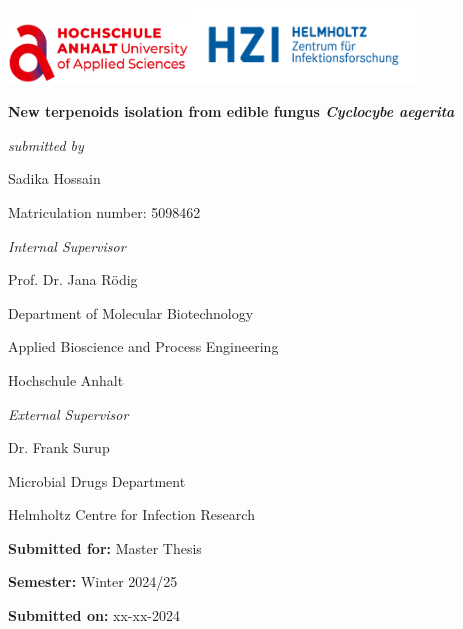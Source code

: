 \begin{titlepage}
	\centering
	
	\vspace{1.5cm}


{%
    \includegraphics[height=1.6cm, keepaspectratio]{images/logo/hs-anhalt-logo.png}\hfill\includegraphics[height=2cm, keepaspectratio]{images/logo/hzi-logo.png}
}

  \vspace{1cm}
	
	{\Large\bfseries New terpenoids isolation from edible fungus \textit{Cyclocybe aegerita}}
 
 
	

 
	\vspace{1cm}

	
	
	{\itshape submitted by}\par


	{\Large Sadika Hossain\par}
	{\small Matriculation number: 5098462\par}

        
        \vspace{1.5cm}
        
	{\itshape Internal Supervisor}\par
        {\Large Prof. Dr. Jana Rödig\par}
        
        {\small Department of Molecular Biotechnology\par}
 	{\small Applied Bioscience and Process Engineering\par}
 	{\small Hochschule Anhalt \par}



        \vspace{1.5cm}
        {\itshape External Supervisor}\par
        {\Large Dr. Frank Surup\par}
	 
	{\small Microbial Drugs Department \par}
 
	{\small Helmholtz Centre for Infection Research \par}

        
        \vspace{1cm}
        
	{\small \textbf{Submitted for:} Master Thesis\par}
	{\small \textbf{Semester:} Winter 2024/25\par}
	{\small \textbf{Submitted on:} xx-xx-2024\par}


\end{titlepage}

\newpage

